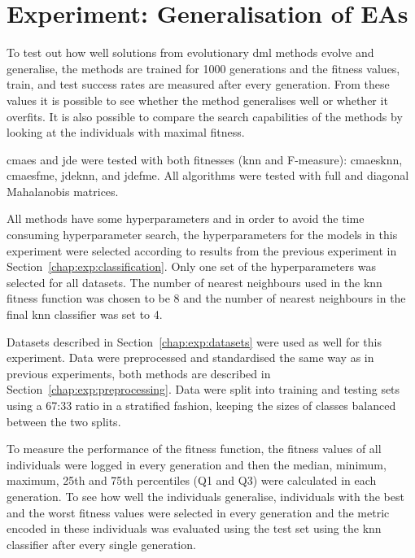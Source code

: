 \documentclass[12pt,a4paper]{report}
\begin{document}

\section{Experiment: Generalisation of EAs} \label{chap:exp:fitness}

To test out how well solutions from evolutionary \ac{dml} methods evolve and generalise, the methods are trained for 1000 generations and the fitness values, train, and test success rates are measured after every generation. From these values it is possible to see whether the method generalises well or whether it overfits. It is also possible to compare the search capabilities of the methods by looking at the individuals with maximal fitness.

\ac{cmaes} and \ac{jde} were tested with both fitnesses (\ac{knn} and \mbox{F-measure}): \ac{cmaesknn}, \ac{cmaesfme}, \ac{jdeknn}, and \ac{jdefme}. All algorithms were tested with full and diagonal Mahalanobis matrices.

All methods have some hyperparameters and in order to avoid the time consuming hyperparameter search, the hyperparameters for the models in this experiment were selected according to results from the previous experiment in Section~\ref{chap:exp:classification}. Only one set of the hyperparameters was selected for all datasets. The number of nearest neighbours used in the \ac{knn} fitness function was chosen to be 8 and the number of nearest neighbours in the final \ac{knn} classifier was set to 4.

Datasets described in Section~\ref{chap:exp:datasets} were used as well for this experiment. Data were preprocessed and standardised the same way as in previous experiments, both methods are described in Section~\ref{chap:exp:preprocessing}. Data were split into training and testing sets using a 67:33 ratio in a stratified fashion, keeping the sizes of classes balanced between the two splits.

To measure the performance of the fitness function, the fitness values of all individuals were logged in every generation and then the median, minimum, maximum, 25th and 75th percentiles (Q1 and Q3) were calculated in each generation. To see how well the individuals generalise, individuals with the best and the worst fitness values were selected in every generation and the metric encoded in these individuals was evaluated using the test set using the \ac{knn} classifier after every single generation.
\end{document}
